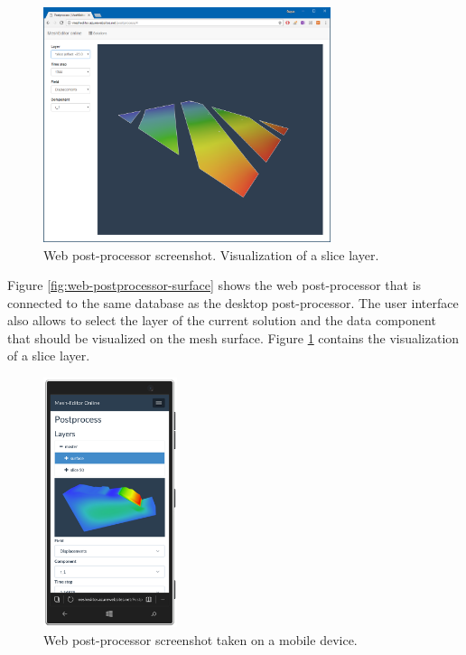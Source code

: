 \begin{figure}[H]
    \centering
    \includegraphics[width=0.75\textwidth]{figures/chapter-data-management/web-postprocessor-slice}
    \decoRule
    \caption{Web post-processor screenshot. Visualization of a slice layer.}
    \label{fig:web-postprocessor-slice}
\end{figure}

Figure \ref{fig:web-postprocessor-surface} shows the web post-processor that is connected to the same database as the desktop post-processor. The user interface also allows to select the layer of the current solution and the data component that should be visualized on the mesh surface. Figure \ref{fig:web-postprocessor-slice} contains the visualization of a slice layer.

\begin{figure}[H]
    \centering
    \includegraphics[width=0.35\textwidth]{figures/chapter-data-management/web-postprocessor-mobile}
    \decoRule
    \caption{Web post-processor screenshot taken on a mobile device.}
    \label{fig:web-postprocessor-mobile}
\end{figure}

